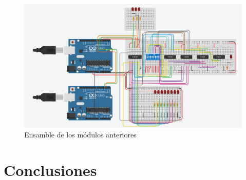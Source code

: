 \documentclass{article}
\begin{document}
\begin{figure}[!ht] 
\includegraphics[width=12cm]{esquemaEnsamble.PNG}
\centering
\caption{Ensamble de los módulos anteriores}
\end{figure}



\section{Conclusiones} \label{conclusiones}



\end{document}
